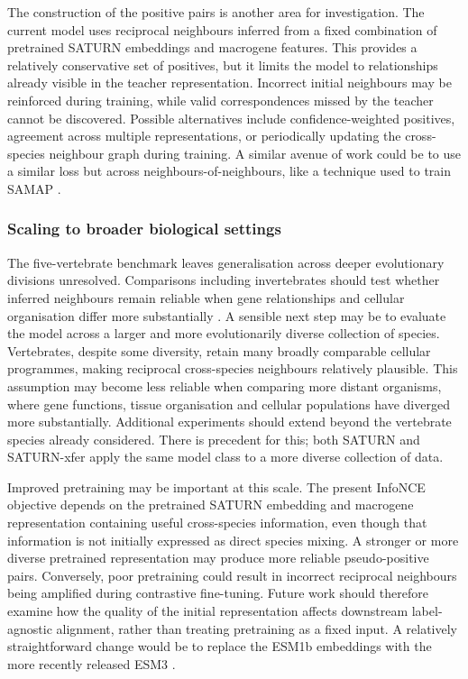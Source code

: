 \documentclass{article}
\begin{document}
The construction of the positive pairs is another area for investigation. The current model uses reciprocal neighbours inferred from a fixed combination of pretrained SATURN embeddings and macrogene features. This provides a relatively conservative set of positives, but it limits the model to relationships already visible in the teacher representation. Incorrect initial neighbours may be reinforced during training, while valid correspondences missed by the teacher cannot be discovered. Possible alternatives include confidence-weighted positives, agreement across multiple representations, or periodically updating the cross-species neighbour graph during training. A similar avenue of work could be to use a similar loss but across neighbours-of-neighbours, like a technique used to train SAMAP \cite{SAMap}.

\subsubsection{Scaling to broader biological settings}
The five-vertebrate benchmark leaves generalisation across deeper evolutionary divisions unresolved. Comparisons including invertebrates should test whether inferred neighbours remain reliable when gene relationships and cellular organisation differ more substantially \cite{SAMap,SATURN-xfer}. A sensible next step may be to evaluate the model across a larger and more evolutionarily diverse collection of species. Vertebrates, despite some diversity, retain many broadly comparable cellular programmes, making reciprocal cross-species neighbours relatively plausible. This assumption may become less reliable when comparing more distant organisms, where gene functions, tissue organisation and cellular populations have diverged more substantially. Additional experiments should extend beyond the vertebrate species already considered. There is precedent for this; both SATURN \cite{SATURN} and SATURN-xfer \cite{SATURN-xfer} apply the same model class to a more diverse collection of data.

Improved pretraining may be important at this scale. The present InfoNCE objective depends on the pretrained SATURN embedding and macrogene representation containing useful cross-species information, even though that information is not initially expressed as direct species mixing. A stronger or more diverse pretrained representation may produce more reliable pseudo-positive pairs. Conversely, poor pretraining could result in incorrect reciprocal neighbours being amplified during contrastive fine-tuning. Future work should therefore examine how the quality of the initial representation affects downstream label-agnostic alignment, rather than treating pretraining as a fixed input. A relatively straightforward change would be to replace the ESM1b embeddings with the more recently released ESM3 \cite{ESM3}.
\end{document}
